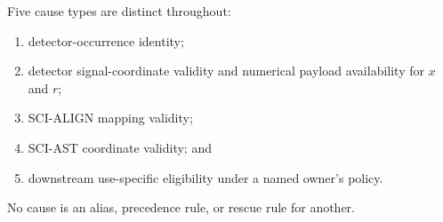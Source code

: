 Five cause types are distinct throughout:
\begin{enumerate}[label=\arabic*.]
  \item detector-occurrence identity;
  \item detector signal-coordinate validity and numerical payload
        availability for $x$ and $r$;
  \item SCI-ALIGN mapping validity;
  \item SCI-AST coordinate validity; and
  \item downstream use-specific eligibility under a named owner's policy.
\end{enumerate}
No cause is an alias, precedence rule, or rescue rule for another.
